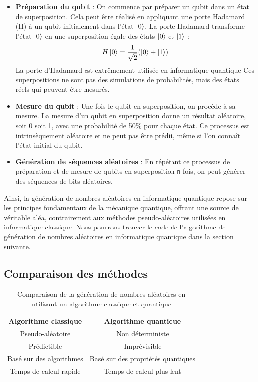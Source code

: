 \documentclass{article}
\begin{document}
\begin{itemize}
  \item \textbf{Préparation du qubit} : On commence par préparer un qubit dans un état de superposition. Cela peut être réalisé en appliquant une porte Hadamard (H) à un qubit initialement dans l'état $\ket{0}$. La porte Hadamard transforme l'état $\ket{0}$ en une superposition égale des états $\ket{0}$ et $\ket{1}$ :
  \[
  H\ket{0} = \frac{1}{\sqrt{2}}(\ket{0} + \ket{1})
  \]
  La porte d'Hadamard est extrêmement utilisée en informatique quantique Ces superpositions ne sont pas des simulations de probabilités, mais des états réels qui peuvent être mesurés.
  \item \textbf{Mesure du qubit} : Une fois le qubit en superposition, on procède à sa mesure. La mesure d'un qubit en superposition donne un résultat aléatoire, soit 0 soit 1, avec une probabilité de 50\% pour chaque état. Ce processus est intrinsèquement aléatoire et ne peut pas être prédit, même si l'on connaît l'état initial du qubit.
  \item \textbf{Génération de séquences aléatoires} : En répétant ce processus de préparation et de mesure de qubits en superposition \texttt{n} fois, on peut générer des séquences de bits aléatoires. 
\end{itemize}

Ainsi, la génération de nombres aléatoires en informatique quantique repose sur les principes
fondamentaux de la mécanique quantique, offrant une source de véritable aléa, contrairement
aux méthodes pseudo-aléatoires utilisées en informatique classique. Nous pourrons trouver le code
de l'algorithme de génération de nombres aléatoires en informatique quantique dans la section suivante.


\subsection{Comparaison des méthodes}

\begin{table}[H]
  \centering
  \begin{tabular}{|c|c|}
    \hline
    \textbf{Algorithme classique} & \textbf{Algorithme quantique} \\
    \hline
    Pseudo-aléatoire & Non déterministe \\
    \hline
    Prédictible & Imprévisible \\
    \hline
    Basé sur des algorithmes & Basé sur des propriétés quantiques \\
    \hline
    Temps de calcul rapide & Temps de calcul plus lent \\
    \hline
  \end{tabular}
  \caption{Comparaison de la génération de nombres aléatoires en utilisant un algorithme classique et quantique}
\end{table}
\end{document}
